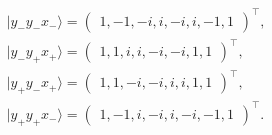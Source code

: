 \documentclass[sn-mathphys]{sn-jnl}%
\theoremstyle{thmstyleone}%
\theoremstyle{thmstyletwo}%
\theoremstyle{thmstylethree}%
\begin{document}
\begin{equation}
\begin{aligned}
& \vert y_-  y_-  x_- \rangle = \begin{pmatrix}1, -1, -i, i, -i, i, -1, 1\end{pmatrix}^\intercal , \\
& \vert y_-  y_+  x_+ \rangle = \begin{pmatrix}1, 1, i, i, -i, -i, 1, 1\end{pmatrix}^\intercal , \\
& \vert y_+  y_-  x_+ \rangle = \begin{pmatrix}1, 1, -i, -i, i, i, 1, 1\end{pmatrix}^\intercal , \\
& \vert y_+  y_+  x_- \rangle = \begin{pmatrix}1, -1, i, -i, i, -i, -1, 1\end{pmatrix}^\intercal
.
\end{aligned}
\end{equation}
\end{document}
